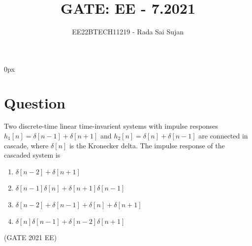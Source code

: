 \documentclass[journal,12pt,twocolumn]{IEEEtran}
\theoremstyle{remark}
\begin{document}
\parindent 0px

\title{GATE: EE - 7.2021}
\author{EE22BTECH11219 - Rada Sai Sujan$^{}$%
}
\maketitle
\newpage
\bigskip
\section*{Question}
Two discrete-time linear time-invarient systems with impulse responses $h_1[n]=\delta[n-1]+\delta[n+1]$ and $h_2[n]=\delta[n]+\delta[n-1]$ are connected in cascade, where $\delta[n]$ is the Kronecker delta. The impulse response of the cascaded system is   \\
\begin{enumerate}[label=(\alph*)]
    \item $\delta[n-2]+\delta[n+1]$
    \item $\delta[n-1]\delta[n]+\delta[n+1]\delta[n-1]$
    \item $\delta[n-2]+\delta[n-1]+\delta[n]+\delta[n+1]$
    \item $\delta[n]\delta[n-1]+\delta[n-2]\delta[n+1]$
\end{enumerate} \hfill(GATE 2021 EE)\\
\solution
\fi
\end{document}
